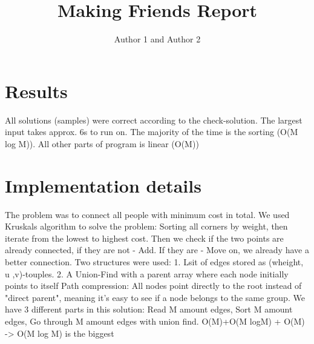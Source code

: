 \documentclass{article}
\title{Making Friends Report}
\author{Author 1 and Author 2}
\begin{document}
  \maketitle

  \section{Results}

  All solutions (samples) were correct according to the check-solution. The largest input takes approx. 6s to run on. The majority of the time is the sorting (O(M log M)). All other parts of program is linear (O(M))

  \section{Implementation details}

  The problem was to connect all people with minimum cost in total. We used Kruskals algorithm to solve the problem: Sorting all corners by weight, then iterate from the lowest to highest cost.
  Then we check if the two points are already connected, if they are not - Add. If they are - Move on, we already have a better connection. 
  Two structures were used: 1. Lsit of edges stored as (wheight, u ,v)-touples. 2. A Union-Find with a parent array where each node initially points to itself
  Path compression: All nodes point directly to the root instead of "direct parent", meaning it's easy to see if a node belongs to the same group. 
  We have 3 different parts in this solution: Read M amount edges, Sort M amount edges, Go through M amount edges with union find. O(M)+O(M logM) + O(M) -> O(M log M) is the biggest
 
\end{document}
